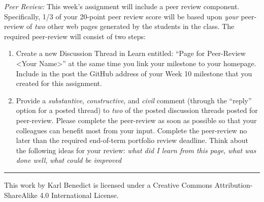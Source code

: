 \documentclass[]{book}
\begin{document}
\emph{Peer Review:} This week's assignment will include a peer review
component. Specifically, 1/3 of your 20-point peer review score will be
based upon \emph{your} peer-review of \emph{two} other web pages
generated by the students in the class. The required peer-review will
consist of two steps:

\begin{enumerate}
\def\labelenumi{\arabic{enumi}.}
\item
  Create a new Discussion Thread in Learn entitled: ``Page for
  Peer-Review \textless{}Your Name\textgreater{}'' at the same time you
  link your milestone to your homepage. Include in the post the GitHub
  address of your Week 10 milestone that you created for this
  assignment.
\item
  Provide a \emph{substantive}, \emph{constructive}, and \emph{civil}
  comment (through the ``reply'' option for a posted thread) to
  \emph{two} of the posted discussion threads posted for peer-review.
  Please complete the peer-review as soon as possible so that your
  colleagues can benefit most from your input. Complete the peer-review
  no later than the required end-of-term portfolio review deadline.
  Think about the following ideas for your review: \emph{what did I
  learn from this page}, \emph{what was done well}, \emph{what could be
  improved}
\end{enumerate}

\begin{center}\rule{0.5\linewidth}{\linethickness}\end{center}

This work by {Karl Benedict} is licensed under a Creative Commons
Attribution-ShareAlike 4.0 International License.
\end{document}

